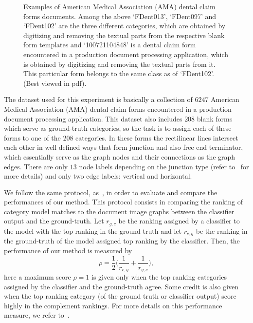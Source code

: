 \documentclass[journal]{IEEEtran}
\theoremstyle{definition}
\begin{document}
\begin{figure}[!htbp]
\centering
{}
\caption{Examples of American Medical Association (AMA) dental claim forms documents. Among the above `FDent013', `FDent097' and `FDent102' are the three different categories, which are obtained by digitizing and removing the textual parts from the respective blank form templates and `100721104848' is a dental claim form encountered in a production document processing application, which is obtained by digitizing and removing the textual parts from it. This particular form belongs to the same class as of `FDent102'. (Best viewed in pdf).}
\label{fig:example-AMA}
\end{figure}
The dataset used for this experiment is basically a collection of $6247$ American Medical Association (AMA) dental claim forms encountered in a production document processing application. This dataset also includes $208$ blank forms which serve as ground-truth categories, so the task is to assign each of these forms to one of the $208$ categories. In these forms the rectilinear lines intersect each other in well defined ways that form junction and also free end terminator, which essentially serve as the graph nodes and their connections as the graph edges. There are only $13$ node labels depending on the junction type (refer to~\cite{Saund2013} for more details) and only two edge labels: vertical and horizontal.

We follow the same protocol, as~\cite{Saund2013}, in order to evaluate and compare the performances of our method. This protocol consists in comparing the ranking of category model matches to the document image graphs between the classifier output and the ground-truth. Let $r_{g,c}$ be the ranking assigned by a classifier to the model with the top ranking in the ground-truth and let $r_{c,g}$ be the ranking in the ground-truth of the model assigned top ranking by the classifier. Then, the performance of our method is measured by 
\begin{equation}
\rho = \frac{1}{2}\Big(\frac{1}{r_{c,g}}+\frac{1}{r_{g,c}}\Big), 
\end{equation}
here a maximum score $\rho=1$ is given only when the top ranking categories assigned by the classifier and the ground-truth agree. Some credit is also given when the top ranking category (of the ground truth or classifier output) score highly in the complement rankings. For more details on this performance measure, we refer to~\cite{Saund2013}.
\end{document}
